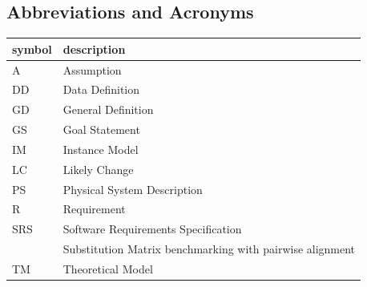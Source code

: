 \documentclass[12pt]{article}
\begin{document}
\subsection{Abbreviations and Acronyms}

\renewcommand{\arraystretch}{1.2}
\begin{tabular}{l l} 
  \toprule		
  \textbf{symbol} & \textbf{description}\\
  \midrule 
  A & Assumption\\
  DD & Data Definition\\
  GD & General Definition\\
  GS & Goal Statement\\
  IM & Instance Model\\
  LC & Likely Change\\
  PS & Physical System Description\\
  R & Requirement\\
  SRS & Software Requirements Specification\\
  \progname{} & Substitution Matrix benchmarking with pairwise alignment\\
  TM & Theoretical Model\\
  \bottomrule
\end{tabular}\\






\end{document}
